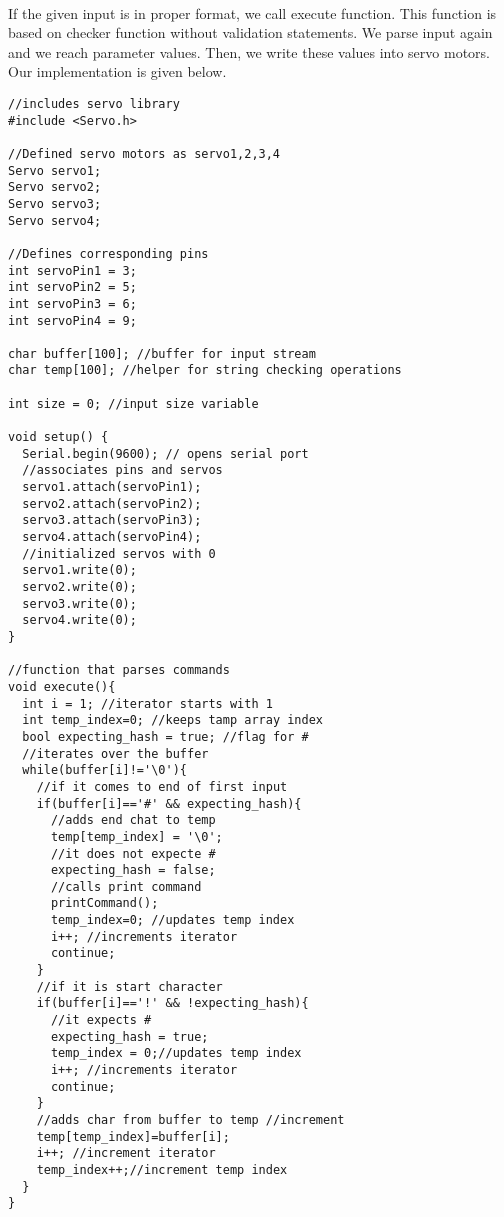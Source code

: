 \documentclass[pdftex,12pt,a4paper]{article}
\begin{document}
\begin{flushleft}
\paragraph{}
If the given input is in proper format, we call execute function. This function is based on checker function without validation statements. We parse input again and we reach parameter values. Then, we write these values into servo motors. Our implementation is given below.

\begin{lstlisting}[language=Arduino]//includes servo library
#include <Servo.h> 

//Defined servo motors as servo1,2,3,4
Servo servo1;
Servo servo2;
Servo servo3;
Servo servo4;

//Defines corresponding pins
int servoPin1 = 3;
int servoPin2 = 5;
int servoPin3 = 6;
int servoPin4 = 9;

char buffer[100]; //buffer for input stream
char temp[100]; //helper for string checking operations

int size = 0; //input size variable

void setup() {
  Serial.begin(9600); // opens serial port
  //associates pins and servos 
  servo1.attach(servoPin1);
  servo2.attach(servoPin2);
  servo3.attach(servoPin3);
  servo4.attach(servoPin4);
  //initialized servos with 0
  servo1.write(0);
  servo2.write(0);
  servo3.write(0);
  servo4.write(0);
}

//function that parses commands
void execute(){
  int i = 1; //iterator starts with 1
  int temp_index=0; //keeps tamp array index
  bool expecting_hash = true; //flag for # 
  //iterates over the buffer
  while(buffer[i]!='\0'){
    //if it comes to end of first input
    if(buffer[i]=='#' && expecting_hash){
      //adds end chat to temp
      temp[temp_index] = '\0';
      //it does not expecte #
      expecting_hash = false;
      //calls print command
      printCommand();
      temp_index=0; //updates temp index
      i++; //increments iterator
      continue;
    }
    //if it is start character
    if(buffer[i]=='!' && !expecting_hash){
      //it expects #
      expecting_hash = true;
      temp_index = 0;//updates temp index
      i++; //increments iterator
      continue;
    }
    //adds char from buffer to temp //increment
	temp[temp_index]=buffer[i];
    i++; //increment iterator
    temp_index++;//increment temp index
  }
}


\end{lstlisting}
\end{flushleft}
\end{document}
